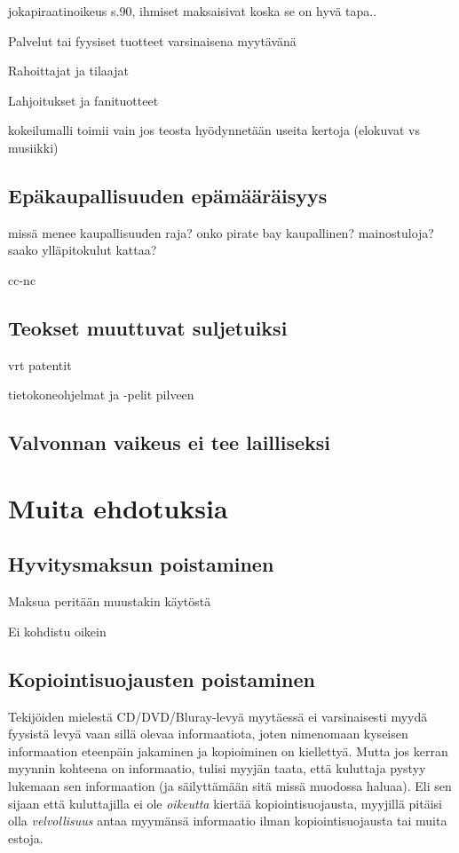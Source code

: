 \documentclass[titlepage,12pt]{article}
\begin{document}
jokapiraatinoikeus s.90, ihmiset maksaisivat koska se on hyvä tapa..


Palvelut tai fyysiset tuotteet varsinaisena myytävänä

Rahoittajat ja tilaajat

Lahjoitukset ja fanituotteet


kokeilumalli toimii vain jos teosta hyödynnetään useita kertoja
(elokuvat vs musiikki)

\subsection{Epäkaupallisuuden epämääräisyys}

missä menee kaupallisuuden raja? onko pirate bay kaupallinen?
mainostuloja? saako ylläpitokulut kattaa?


cc-nc

\subsection{Teokset muuttuvat suljetuiksi}

vrt patentit

tietokoneohjelmat ja -pelit pilveen

\subsection{Valvonnan vaikeus ei tee lailliseksi}

\section{Muita ehdotuksia}

\subsection{Hyvitysmaksun poistaminen}

Maksua peritään muustakin käytöstä

Ei kohdistu oikein

\subsection{Kopiointisuojausten poistaminen}

Tekijöiden mielestä CD/DVD/Bluray-levyä myytäessä ei varsinaisesti
myydä fyysistä levyä vaan sillä olevaa informaatiota, joten nimenomaan
kyseisen informaation eteenpäin jakaminen ja kopioiminen on
kiellettyä.  Mutta jos kerran myynnin kohteena on informaatio, tulisi
myyjän taata, että kuluttaja pystyy lukemaan sen informaation (ja
säilyttämään sitä missä muodossa haluaa).  Eli sen sijaan että
kuluttajilla ei ole \emph{oikeutta} kiertää kopiointisuojausta,
myyjillä pitäisi olla \emph{velvollisuus} antaa myymänsä informaatio
ilman kopiointisuojausta tai muita estoja.
\end{document}
